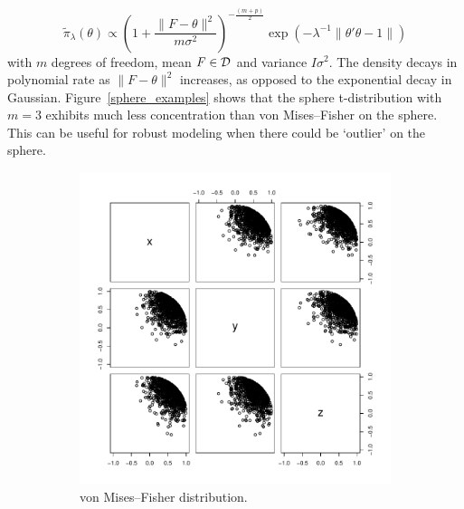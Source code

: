 \documentclass[10pt,fleqn]{article}
\DeclareMathOperator{\1}{\mathbbm{1}} \DeclareMathOperator{\bigO}{\mc O}
\begin{document}
$$
\tilde\pi_{\lambda}(\theta)
\propto 
(1+\frac{\|F-\theta\|^2}{m\sigma^2})^{-\frac{(m+p)}{2}}\exp(- \lambda^{-1}\|\theta'\theta-1\|)
$$
with $m$ degrees of freedom, mean $F\in \mathcal{D}$ and variance $I\sigma^2$. The
density decays in polynomial rate as $\|F-\theta\|^2$ increases, as opposed to the
exponential decay in Gaussian. Figure~\ref{sphere_examples} shows that the
sphere t-distribution with $m=3$ exhibits much less concentration than von
Mises--Fisher on the sphere. This can be useful for robust modeling when there
could be `outlier' on the sphere.
\begin{figure}[h]
\begin{subfigure}[b]{0.45\textwidth}
\includegraphics[width=1\textwidth]{sphere_vmf.pdf}
\caption{von Mises--Fisher distribution.}
\end{subfigure}
\begin{subfigure}[b]{0.45\textwidth}

\end{subfigure}
\end{figure}
\end{document}
